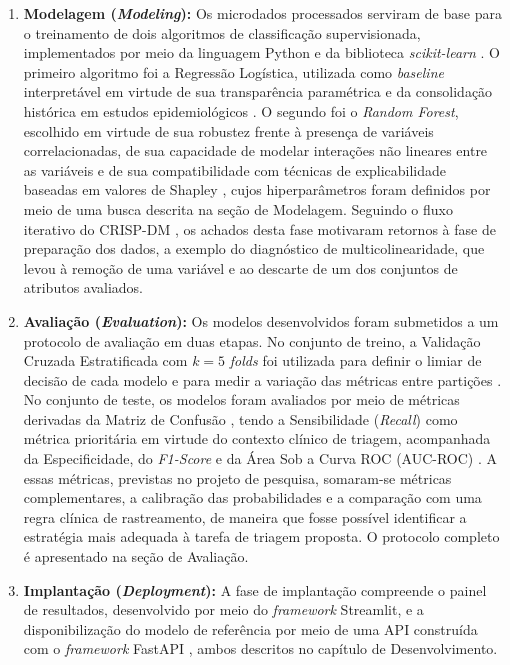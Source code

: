 \begin{enumerate}
    \item \textbf{Modelagem (\textit{Modeling}):} Os microdados processados serviram de base para o treinamento de dois algoritmos de classificação supervisionada, implementados por meio da linguagem Python e da biblioteca \textit{scikit-learn} \cite{pedregosa2011scikit}. O primeiro algoritmo foi a Regressão Logística, utilizada como \textit{baseline} interpretável em virtude de sua transparência paramétrica e da consolidação histórica em estudos epidemiológicos \cite{nusinovici2020logistic}. O segundo foi o \textit{Random Forest}, escolhido em virtude de sua robustez frente à presença de variáveis correlacionadas, de sua capacidade de modelar interações não lineares entre as variáveis e de sua compatibilidade com técnicas de explicabilidade baseadas em valores de Shapley \cite{salih2025perspective}, cujos hiperparâmetros foram definidos por meio de uma busca descrita na seção de Modelagem. Seguindo o fluxo iterativo do CRISP-DM \cite{wirth2000crisp}, os achados desta fase motivaram retornos à fase de preparação dos dados, a exemplo do diagnóstico de multicolinearidade, que levou à remoção de uma variável e ao descarte de um dos conjuntos de atributos avaliados.

    \item \textbf{Avaliação (\textit{Evaluation}):} Os modelos desenvolvidos foram submetidos a um protocolo de avaliação em duas etapas. No conjunto de treino, a Validação Cruzada Estratificada com $k = 5$ \textit{folds} \cite{pertiwi2020comparison} foi utilizada para definir o limiar de decisão de cada modelo e para medir a variação das métricas entre partições \cite{pedregosa2011scikit}. No conjunto de teste, os modelos foram avaliados por meio de métricas derivadas da Matriz de Confusão \cite{Swaminathan2024}, tendo a Sensibilidade (\textit{Recall}) como métrica prioritária em virtude do contexto clínico de triagem, acompanhada da Especificidade, do \textit{F1-Score} e da Área Sob a Curva ROC (AUC-ROC) \cite{fawcett2006introduction, powers2020evaluation}. A essas métricas, previstas no projeto de pesquisa, somaram-se métricas complementares, a calibração das probabilidades e a comparação com uma regra clínica de rastreamento, de maneira que fosse possível identificar a estratégia mais adequada à tarefa de triagem proposta. O protocolo completo é apresentado na seção de Avaliação.

   \item \textbf{Implantação (\textit{Deployment}):} A fase de implantação compreende o painel de resultados, desenvolvido por meio do \textit{framework} Streamlit, e a disponibilização do modelo de referência por meio de uma API construída com o \textit{framework} FastAPI \cite{ramirez2018fastapi}, ambos descritos no capítulo de Desenvolvimento.
\end{enumerate}

